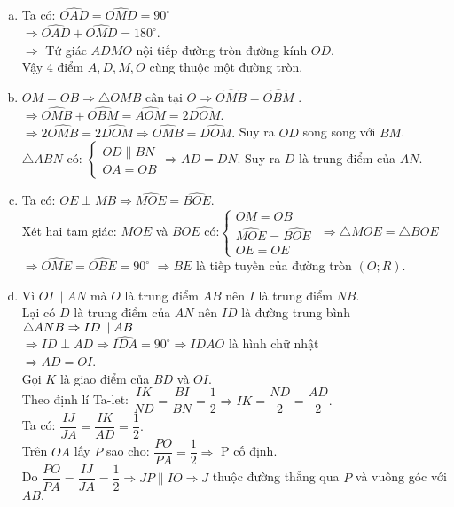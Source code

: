 \begin{ex}
{\begin{center}
\end{center}
	\begin{enumerate}[a)]
		\item Ta có: $\widehat{OAD}=\widehat{OMD}=90^{\circ}$\\
		$\Rightarrow \widehat{OAD}+\widehat{OMD}=180^{\circ}$.\\
		$\Rightarrow$ Tứ giác $ADMO$ nội tiếp đường tròn đường kính $OD$.\\
		Vậy 4 điểm $A, D, M, O$ cùng thuộc một đường tròn.
		\item $OM=OB\Rightarrow \triangle OMB$ cân tại $O\Rightarrow\widehat{OMB}=\widehat{OBM}$ .\\
		$\Rightarrow \widehat{OMB}+\widehat{OBM}=\widehat{AOM}=2\widehat{DOM}$.\\
			$\Rightarrow 2\widehat{OMB}=2\widehat{DOM}\Rightarrow \widehat{OMB}=\widehat{DOM}.$
		Suy ra $OD$ song song với $BM$.\\
$\triangle ABN$ có: $\begin{cases}
OD\parallel BN\\
OA=OB
\end{cases}$$\Rightarrow AD=DN.$ Suy ra $D$ là trung điểm của $AN$.
		\item Ta có: $OE\perp MB\Rightarrow \widehat{MOE}=\widehat{BOE}.$\\
		Xét hai tam giác: $MOE$ và $BOE$ có:$\begin{cases}
		OM=OB\\
		\widehat{MOE}=\widehat{BOE}\\
		OE=OE
		\end{cases}$ $\Rightarrow \triangle MOE=\triangle BOE$\\$\Rightarrow \widehat{OME}=\widehat{OBE}=90^{\circ}$
		$\Rightarrow  BE$ là tiếp tuyến của đường tròn $(O;R)$.
		\item Vì $OI\parallel AN$ mà $O$ là trung điểm $AB$ nên $I$ là trung điểm $NB$.\\
		Lại có $D$ là trung điểm của $AN$ nên $ID$ là đường trung bình $\triangle ANB\\
		\Rightarrow ID\parallel AB$\\
		$\Rightarrow ID\perp AD\Rightarrow \widehat{IDA}=90^{\circ}\Rightarrow IDAO$ là hình chữ nhật\\ $\Rightarrow AD=OI$.\\
		Gọi $K$ là giao điểm của $BD$ và $OI$.\\
		Theo định lí Ta-let: $\dfrac{IK}{ND}=\dfrac{BI}{BN}=\dfrac{1}{2} \Rightarrow IK=\dfrac{ND}{2}=\dfrac{AD}{2}.$\\
		Ta có: $\dfrac{IJ}{JA}=\dfrac{IK}{AD}=\dfrac{1}{2}.$\\
		Trên $OA$ lấy $P$ sao cho: $\dfrac{PO}{PA}=\dfrac{1}{2}\Rightarrow$ P cố định.\\
		Do $\dfrac{PO}{PA}=\dfrac{IJ}{JA}=\dfrac{1}{2}\Rightarrow JP\parallel IO\Rightarrow J$ thuộc đường thẳng qua $P$ và vuông góc với $AB.$
\end{enumerate}}
	\end{ex}

